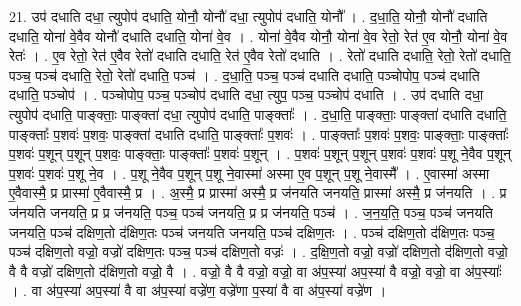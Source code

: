 \documentclass[17pt]{extarticle}
\begin{document}
21. उप॑ दधाति दधा॒ त्युपोप॑ दधाति॒ योनौ॒ योनौ॑ दधा॒ त्युपोप॑ दधाति॒ योनौ᳚ । . द॒धा॒ति॒ योनौ॒ योनौ॑ दधाति दधाति॒ योना॑ वे॒वैव योनौ॑ दधाति दधाति॒ योना॑ वे॒व । . योना॑ वे॒वैव योनौ॒ योना॑ वे॒व रेतो॒ रेत॑ ए॒व योनौ॒ योना॑ वे॒व रेतः॑ । . ए॒व रेतो॒ रेत॑ ए॒वैव रेतो॑ दधाति दधाति॒ रेत॑ ए॒वैव रेतो॑ दधाति । . रेतो॑ दधाति दधाति॒ रेतो॒ रेतो॑ दधाति॒ पञ्च॒ पञ्च॑ दधाति॒ रेतो॒ रेतो॑ दधाति॒ पञ्च॑ । . द॒धा॒ति॒ पञ्च॒ पञ्च॑ दधाति दधाति॒ पञ्चोपोप॒ पञ्च॑ दधाति दधाति॒ पञ्चोप॑ । . पञ्चोपोप॒ पञ्च॒ पञ्चोप॑ दधाति दधा॒ त्युप॒ पञ्च॒ पञ्चोप॑ दधाति । . उप॑ दधाति दधा॒ त्युपोप॑ दधाति॒ पाङ्क्ताः॒ पाङ्क्ता॑ दधा॒ त्युपोप॑ दधाति॒ पाङ्क्ताः᳚ । . द॒धा॒ति॒ पाङ्क्ताः॒ पाङ्क्ता॑ दधाति दधाति॒ पाङ्क्ताः᳚ प॒शवः॑ प॒शवः॒ पाङ्क्ता॑ दधाति दधाति॒ पाङ्क्ताः᳚ प॒शवः॑ । . पाङ्क्ताः᳚ प॒शवः॑ प॒शवः॒ पाङ्क्ताः॒ पाङ्क्ताः᳚ प॒शवः॑ प॒शून् प॒शून् प॒शवः॒ पाङ्क्ताः॒ पाङ्क्ताः᳚ प॒शवः॑ प॒शून् । . प॒शवः॑ प॒शून् प॒शून् प॒शवः॑ प॒शवः॑ प॒शू ने॒वैव प॒शून् प॒शवः॑ प॒शवः॑ प॒शू ने॒व । . प॒शू ने॒वैव प॒शून् प॒शू ने॒वास्मा॑ अस्मा ए॒व प॒शून् प॒शू ने॒वास्मै᳚ । . ए॒वास्मा॑ अस्मा ए॒वैवास्मै॒ प्र प्रास्मा॑ ए॒वैवास्मै॒ प्र । . अ॒स्मै॒ प्र प्रास्मा॑ अस्मै॒ प्र ज॑नयति जनयति॒ प्रास्मा॑ अस्मै॒ प्र ज॑नयति । . प्र ज॑नयति जनयति॒ प्र प्र ज॑नयति॒ पञ्च॒ पञ्च॑ जनयति॒ प्र प्र ज॑नयति॒ पञ्च॑ । . ज॒न॒य॒ति॒ पञ्च॒ पञ्च॑ जनयति जनयति॒ पञ्च॑ दक्षिण॒तो द॑क्षिण॒तः पञ्च॑ जनयति जनयति॒ पञ्च॑ दक्षिण॒तः । . पञ्च॑ दक्षिण॒तो द॑क्षिण॒तः पञ्च॒ पञ्च॑ दक्षिण॒तो वज्रो॒ वज्रो॑ दक्षिण॒तः पञ्च॒ पञ्च॑ दक्षिण॒तो वज्रः॑ । . द॒क्षि॒ण॒तो वज्रो॒ वज्रो॑ दक्षिण॒तो द॑क्षिण॒तो वज्रो॒ वै वै वज्रो॑ दक्षिण॒तो द॑क्षिण॒तो वज्रो॒ वै । . वज्रो॒ वै वै वज्रो॒ वज्रो॒ वा अ॑प॒स्या॑ अप॒स्या॑ वै वज्रो॒ वज्रो॒ वा अ॑प॒स्याः᳚ । . वा अ॑प॒स्या॑ अप॒स्या॑ वै वा अ॑प॒स्या॑ वज्रे॑ण॒ वज्रे॑णा प॒स्या॑ वै वा अ॑प॒स्या॑ वज्रे॑ण । \newline
\end{document}
